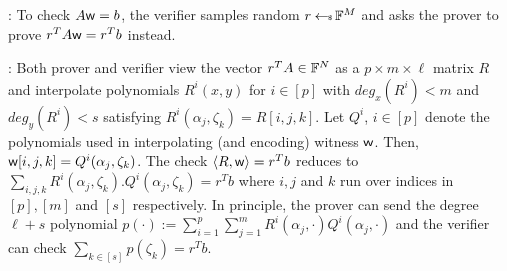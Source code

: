 : To check $A\mathsf{w} = b$, the verifier samples
random $r\hskip2.3pt{\gets\!\!\mbox{\tiny${\$}$\normalsize}}\, \mathbb{F}^M$ and asks the prover to prove $r^TA\mathsf{w} = r^Tb$ instead.
\smallskip

: Both prover and verifier view the
vector $r^TA\in \mathbb{F}^N$ as a $p\times m\times \ell$ matrix $R$ and interpolate
polynomials $R^i(x,y)$ for $i\in [p]$ with $deg_x(R^i)<m$ and $deg_y(R^i)<s$
satisfying $R^i(\alpha_j,\zeta_k)=R[i,j,k]$. Let $Q^i$, $i\in [p]$ denote the
polynomials used in interpolating (and encoding) witness $\mathsf{w}$. Then, 
$\mathsf{w}[i,j,k]=Q^i(\alpha_j,\zeta_k)$. The check $\langle R,\mathsf{w}\rangle=r^Tb$ reduces to
$\sum_{i,j,k}R^i(\alpha_j,\zeta_k).Q^i(\alpha_j,\zeta_k)=r^Tb$ where $i,j$ and
$k$ run over indices in $[p],[m]$ and $[s]$ respectively. In principle, the
prover can send the degree $\ell+s$ polynomial
$p(\cdot):=\sum_{i=1}^p\sum_{j=1}^mR^i(\alpha_j,\cdot)Q^i(\alpha_j,\cdot)$ and
the verifier can check $\sum_{k\in [s]} p(\zeta_k)=r^Tb$. 
\smallskip


